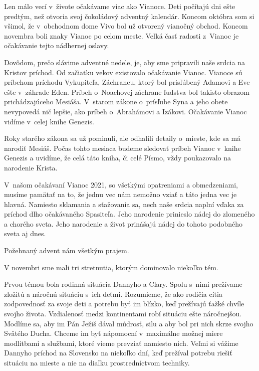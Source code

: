 \def\velkostpisma{10}
\def\velkostriadku{12.5}



Len málo vecí v~živote očakávame viac ako Vianoce. Deti počítajú dni ešte predtým, než otvoria svoj čokoládový adventný kalendár. Koncom októbra som si všimol, že v~obchodnom dome Vivo bol už otvorený vianočný obchod. Koncom novembra boli znaky Vianoc po celom meste. Veľká časť radosti z~Vianoc je očakávanie tejto nádhernej oslavy.

Dovôdom, prečo slávime adventné nedele, je, aby sme pripravili naše srdcia na Kristov príchod. Od začiatku vekov existovalo očakávanie Vianoc. Vianoce sú príbehom príchodu Vykupiteľa, Záchrancu, ktorý bol prisľúbený Adamovi a Eve ešte v~záhrade Eden. Príbeh o~Noachovej záchrane ľudstva bol takisto obrazom prichádzajúceho Mesiáša. V~starom zákone o~prísľube Syna a jeho obete nevypovedá nič lepšie, ako príbeh o~Abrahámovi a Izákovi. Očakávanie Vianoc vidíme v~celej knihe Genezis.

Roky starého zákona sa už pominuli, ale odhalili detaily o~mieste, kde sa má narodiť Mesiáš. Počas tohto mesiaca budeme sledovať príbeh Vianoc v~knihe Genezis a uvidíme, že celá táto kniha, či celé Písmo, vždy poukazovalo na narodenie Krista.

V~našom očakávaní Vianoc 2021, so všetkými opatreniami a obmedzeniami, musíme pamätať na to, že jednu vec nám nemožno vziať a táto jedna vec je hlavná. Namiesto sklamania a sťažovania sa, nech naše srdcia naplní vďaka za príchod dlho očakávaného Spasiteľa. Jeho narodenie prinieslo nádej do zlomeného a chorého sveta. Jeho narodenie a život prinášajú nádej do tohoto podobného sveta aj dnes.

Požehnaný advent nám všetkým prajem.



V novembri sme mali tri stretnutia, ktorým dominovalo niekoľko tém.

Prvou témou bola rodinná situácia Dannyho a Clary. Spolu s~nimi prežívame zložitú a náročnú situáciu s~ich deťmi. Rozumieme, že ako rodičia cítia zodpovednosť za svoje deti a potrebu byť im blízko, keď prežívajú ťažké chvíle svojho života. Vzdialenosť medzi kontinentami robí situáciu ešte náročnejšou. Modlíme sa, aby im Pán Ježiš dával múdrosť, silu a aby bol pri nich skrze svojho Svätého Ducha. Chceme im byť nápomocní v~maximálne možnej miere modlitbami a službami, ktoré vieme prevziať namiesto nich. Veľmi si vážime Dannyho príchod na Slovensko na niekoľko dní, keď prežíval potrebu riešiť situáciu na mieste a nie na diaľku prostredníctvom techniky.

